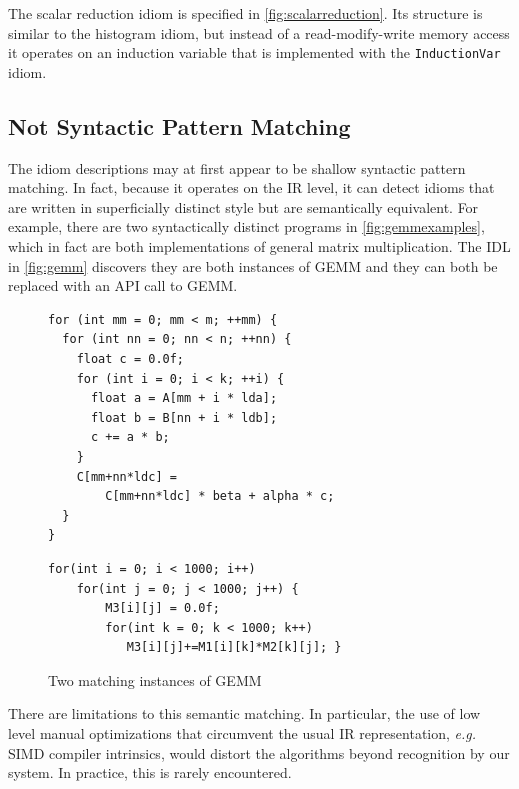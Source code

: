 The scalar reduction idiom is specified in \autoref{fig:scalarreduction}.
Its structure is similar to the histogram idiom, but instead of a read-modify-write memory access
it operates on an induction variable that is implemented with the \texttt{InductionVar} idiom.

\subsection{Not Syntactic Pattern Matching}
The idiom descriptions may at first appear to be shallow syntactic pattern matching.
In fact, because it operates on the IR level, it can detect idioms that are written in superficially distinct style but are semantically equivalent.
For example, there are two syntactically distinct programs in \autoref{fig:gemmexamples}, which in fact are both implementations of general matrix multiplication.
The IDL in \autoref{fig:gemm} discovers they are both instances of GEMM and they can both be replaced with an API call to GEMM.

\begin{figure}[ht]
\begin{lstlisting}[numbers=none,basicstyle=\linespread{1.133}\footnotesize\ttfamily]
for (int mm = 0; mm < m; ++mm) {
  for (int nn = 0; nn < n; ++nn) {
    float c = 0.0f;
    for (int i = 0; i < k; ++i) {
      float a = A[mm + i * lda]; 
      float b = B[nn + i * ldb];
      c += a * b;
    }
    C[mm+nn*ldc] =
        C[mm+nn*ldc] * beta + alpha * c;
  }
}
\end{lstlisting}
\vspace{1em}
\begin{lstlisting}[numbers=none,basicstyle=\linespread{1.133}\footnotesize\ttfamily]
for(int i = 0; i < 1000; i++)
    for(int j = 0; j < 1000; j++) {
        M3[i][j] = 0.0f;
        for(int k = 0; k < 1000; k++)
           M3[i][j]+=M1[i][k]*M2[k][j]; }
\end{lstlisting}
\vspace{-0.3cm}
\caption{Two matching instances of GEMM}
\label{fig:gemmexamples}
\end{figure}

    There are limitations to this semantic matching.
    In particular, the use of low level manual optimizations that circumvent the
    usual IR representation, {\em e.g.}  SIMD compiler intrinsics, would distort
    the algorithms beyond recognition by our system.
    In practice, this is rarely encountered.



